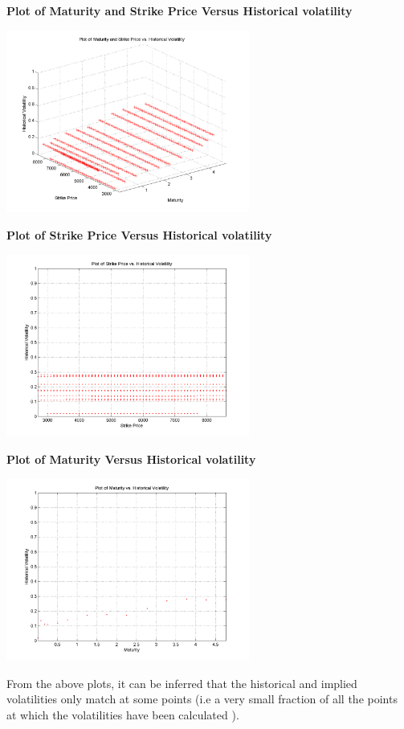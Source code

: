 \documentclass{article}
\begin{document}
\textbf{Plot of Maturity and Strike Price Versus Historical volatility}
\begin{center}
\includegraphics[width =80mm]{Lab9_Q3-Figure1}
\end{center}

\textbf{Plot of Strike Price Versus Historical volatility}
\begin{center}
\includegraphics[width =80mm]{Lab9_Q3-Figure2}
\end{center}

\textbf{Plot of Maturity Versus Historical volatility}
\begin{center}
\includegraphics[width =80mm]{Lab9_Q3-Figure3}
\end{center}

From the above plots, it can be inferred that the historical and implied volatilities only match at some points (i.e a very small fraction of all the points at which the volatilities have been calculated ).
\end{document}

